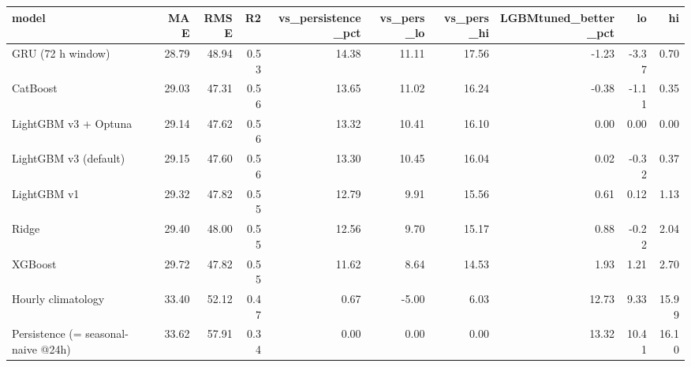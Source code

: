\begin{tabular}{lrrrrrrrrr}
\toprule
model & MAE & RMSE & R2 & vs_persistence_pct & vs_pers_lo & vs_pers_hi & LGBMtuned_better_pct & lo & hi \\
\midrule
GRU (72 h window) & 28.79 & 48.94 & 0.53 & 14.38 & 11.11 & 17.56 & -1.23 & -3.37 & 0.70 \\
CatBoost & 29.03 & 47.31 & 0.56 & 13.65 & 11.02 & 16.24 & -0.38 & -1.11 & 0.35 \\
LightGBM v3 + Optuna & 29.14 & 47.62 & 0.56 & 13.32 & 10.41 & 16.10 & 0.00 & 0.00 & 0.00 \\
LightGBM v3 (default) & 29.15 & 47.60 & 0.56 & 13.30 & 10.45 & 16.04 & 0.02 & -0.32 & 0.37 \\
LightGBM v1 & 29.32 & 47.82 & 0.55 & 12.79 & 9.91 & 15.56 & 0.61 & 0.12 & 1.13 \\
Ridge & 29.40 & 48.00 & 0.55 & 12.56 & 9.70 & 15.17 & 0.88 & -0.22 & 2.04 \\
XGBoost & 29.72 & 47.82 & 0.55 & 11.62 & 8.64 & 14.53 & 1.93 & 1.21 & 2.70 \\
Hourly climatology & 33.40 & 52.12 & 0.47 & 0.67 & -5.00 & 6.03 & 12.73 & 9.33 & 15.99 \\
Persistence (= seasonal-naive @24h) & 33.62 & 57.91 & 0.34 & 0.00 & 0.00 & 0.00 & 13.32 & 10.41 & 16.10 \\
\bottomrule
\end{tabular}
